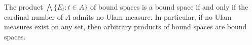 The product $\bigwedge \{E_t : t \in A\}$ of bound spaces is a bound space if and only if the cardinal number of $A$ admits no Ulam measure. In particular, if no Ulam measures exist on any set, then arbitrary products of bound spaces are bound spaces.
